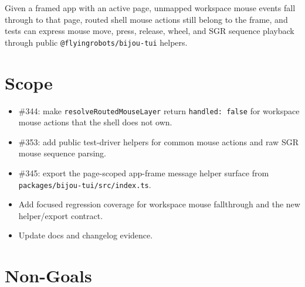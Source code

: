 Given a framed app with an active page, unmapped workspace mouse events fall through to that page, routed shell mouse actions still belong to the frame, and tests can express mouse move, press, release, wheel, and SGR sequence playback through public \texttt{@\allowbreak{}f\allowbreak{}l\allowbreak{}y\allowbreak{}i\allowbreak{}n\allowbreak{}g\allowbreak{}r\allowbreak{}o\allowbreak{}b\allowbreak{}o\allowbreak{}t\allowbreak{}s\allowbreak{}/\allowbreak{}b\allowbreak{}i\allowbreak{}j\allowbreak{}o\allowbreak{}u\allowbreak{}-\allowbreak{}t\allowbreak{}u\allowbreak{}i} helpers.

\section{Scope}\label{record-165-scope}

\begin{itemize}
\tightlist
\item
  \#344: make \texttt{r\allowbreak{}e\allowbreak{}s\allowbreak{}o\allowbreak{}l\allowbreak{}v\allowbreak{}e\allowbreak{}R\allowbreak{}o\allowbreak{}u\allowbreak{}t\allowbreak{}e\allowbreak{}d\allowbreak{}M\allowbreak{}o\allowbreak{}u\allowbreak{}s\allowbreak{}e\allowbreak{}L\allowbreak{}a\allowbreak{}y\allowbreak{}e\allowbreak{}r} return \texttt{h\allowbreak{}a\allowbreak{}n\allowbreak{}d\allowbreak{}l\allowbreak{}e\allowbreak{}d\allowbreak{}:\allowbreak{} \allowbreak{}f\allowbreak{}a\allowbreak{}l\allowbreak{}s\allowbreak{}e} for workspace mouse actions that the shell does not own.
\item
  \#353: add public test-driver helpers for common mouse actions and raw SGR mouse sequence parsing.
\item
  \#345: export the page-scoped app-frame message helper surface from \texttt{p\allowbreak{}a\allowbreak{}c\allowbreak{}k\allowbreak{}a\allowbreak{}g\allowbreak{}e\allowbreak{}s\allowbreak{}/\allowbreak{}b\allowbreak{}i\allowbreak{}j\allowbreak{}o\allowbreak{}u\allowbreak{}-\allowbreak{}t\allowbreak{}u\allowbreak{}i\allowbreak{}/\allowbreak{}s\allowbreak{}r\allowbreak{}c\allowbreak{}/\allowbreak{}i\allowbreak{}n\allowbreak{}d\allowbreak{}e\allowbreak{}x\allowbreak{}.\allowbreak{}t\allowbreak{}s}.
\item
  Add focused regression coverage for workspace mouse fallthrough and the new helper/export contract.
\item
  Update docs and changelog evidence.
\end{itemize}

\section{Non-Goals}\label{record-165-non-goals}

